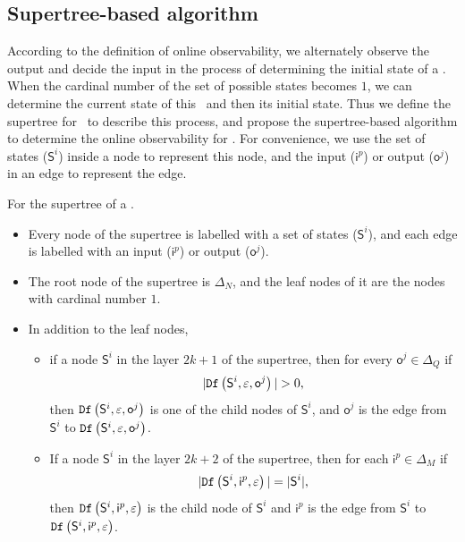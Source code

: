 \subsection{Supertree-based algorithm} %
According to the definition of online observability, we alternately observe the output and decide the input in the process of determining the initial state of a \BCN. When the cardinal number of the set of possible states becomes $1$, we can determine the current state of this \BCN\ and then its initial state. Thus we define the supertree for \BCNs\ to describe this process, and propose the supertree-based algorithm to determine the online observability for \BCNs. For convenience, we use the set of states ($\mathsf{S}^i$) inside a node to represent this node, and the input ($\mathsf{i}^p$) or output ($\mathsf{o}^j$) in an edge to represent the edge.
\begin{definition}[Supertree]
For the supertree of a \BCN.   
\begin{itemize}
 \item  Every node of the supertree is labelled with a set of states ($\mathsf{S}^i$), and each edge is labelled with an input ($\mathsf{i}^p$) or output ($\mathsf{o}^j$).
 \item  The root node of the supertree is $\Delta_N$, and the leaf nodes of it are the nodes with cardinal number $1$.%
 \item In addition to the leaf nodes, 
 \begin{itemize}
 \item if a node $\mathsf{S}^i$ in the layer $2k + 1$ of the supertree, then for every $\mathsf{o}^j\in \Delta_Q$ if
\[|\Ded\left(\mathsf{S}^i,\varepsilon, \mathsf{o}^j\right)|>0,\]
 then ${\tt Df}\left(\mathsf{S}^i,\varepsilon, \mathsf{o}^j\right)$ is one of the child nodes of $\mathsf{S}^i$, and $\mathsf{o}^j$ is the edge from $\mathsf{S}^i$ to ${\tt Df}\left(\mathsf{S}^i,\varepsilon, \mathsf{o}^j\right)$.
 \item If a node $\mathsf{S}^i$ in the layer $2k+2$ of the supertree, then for each $\mathsf{i}^p \in \Delta_M$ if
\[|{\tt Df}\left(\mathsf{S}^i,\mathsf{i}^p,\varepsilon\right)|=|\mathsf{S}^i|,\] 
then ${\tt Df}\left(\mathsf{S}^i,\mathsf{i}^p,\varepsilon\right)$ is the child node of $\mathsf{S}^i$ and $\mathsf{i}^p$ is the edge from $\mathsf{S}^i$ to ${\tt Df}\left(\mathsf{S}^i,\mathsf{i}^p,\varepsilon\right)$. 
 \end{itemize}
 
  
 \end{itemize}
\label{def:super-tree}
\end{definition}

